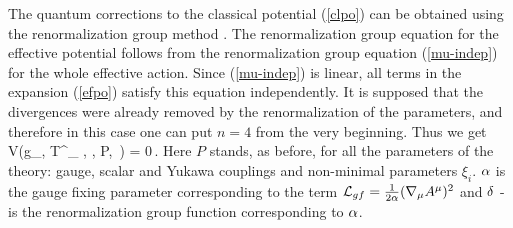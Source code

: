 The quantum corrections to the classical potential (\ref{clpo})
can be obtained using the renormalization group method 
\cite{colwe,tmf,book,bosh-pot}. The renormalization group equation
for the effective potential follows from the renormalization group 
equation (\ref{mu-indep}) for the whole effective action. Since   
(\ref{mu-indep}) is linear, all terms in the expansion 
(\ref{efpo}) satisfy this equation independently. 
It is supposed that the divergences were already removed by the 
renormalization of the parameters, and therefore in this case 
one can put $n=4$ from the very beginning. Thus we get 
\beq
{}\,
V\left(g_{\mu\nu}, T^\al_{\,\cdot\,\be\ga}, \ph, P, \mu\,\right)
= 0\,.
\label{efpo-indep}
\eeq
Here $P$ stands, as before, for all the parameters of the theory:  
gauge, scalar and Yukawa couplings and non-minimal 
parameters $\xi_i$. 
$\alpha$ is the gauge fixing parameter corresponding to the term
${\cal L}_{gf} = \frac{1}{2\alpha}(\nabla_\mu A^\mu)^2$ and 
$\delta$ - is the renormalization group function corresponding to $\alpha$. 

